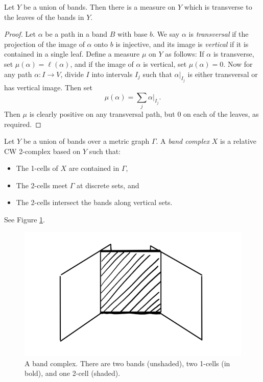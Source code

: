 \begin{lemma}\label{Ymeasure}
    Let $Y$ be a union of bands. Then there is a measure on $Y$ which is transverse to the leaves of the bands in $Y$.
\end{lemma}
\begin{proof}
     Let $\alpha$ be a path in a band $B$ with base $b$. We say $\alpha$ is \textit{transversal} if the projection of the image of $\alpha$ onto $b$ is injective, and its image is \textit{vertical} if it is contained in a single leaf. Define a measure $\mu$ on $Y$ as follows: If $\alpha$ is transverse, set $\mu(\alpha)=\ell(\alpha)$, and if the image of $\alpha$ is vertical, set $\mu(\alpha)=0$. Now for any path $\alpha:I\rightarrow V$, divide $I$ into intervals $I_j$ such that $\alpha\vert_{I_j}$ is either transversal or has vertical image. Then set \[\mu(\alpha)=\underset{j}\sum\alpha\vert_{I_j}.\] Then $\mu$ is clearly positive on any transversal path, but 0 on each of the leaves, as required.
\end{proof}


\begin{definition}
    Let $Y$ be a union of bands over a metric graph $\Gamma$. A \emph{band complex} $X$ is a relative CW 2-complex based on $Y$ such that:
    \begin{itemize}
        \item The 1-cells of $X$ are contained in $\Gamma$,
        \item The 2-cells meet $\Gamma$ at discrete sets, and
        \item The 2-cells intersect the bands along vertical sets.
    \end{itemize}
    See Figure \ref{bandcplx}.
\end{definition}

\begin{figure}[h]
    \centering
    \includegraphics[width=0.6\linewidth]{sections/lorna/Band Complex.png}
    \caption{A band complex. There are two bands (unshaded), two 1-cells (in bold), and one 2-cell (shaded).}
    \label{bandcplx}
\end{figure}

